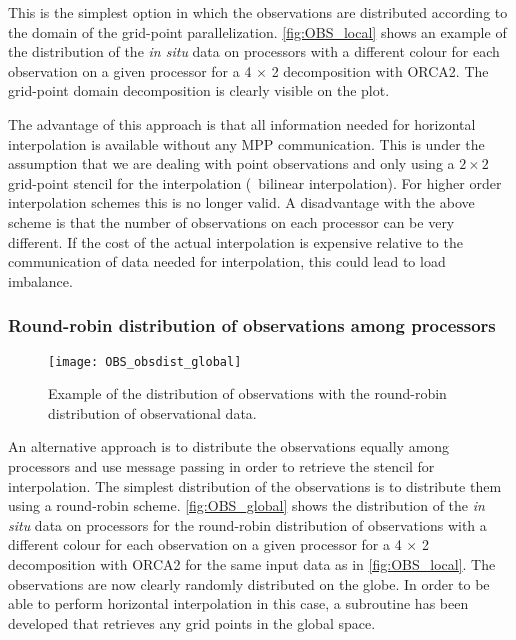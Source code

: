 \documentclass[../main/NEMO_manual]{subfiles}
\begin{document}
This is the simplest option in which the observations are distributed according to
the domain of the grid-point parallelization.
\autoref{fig:OBS_local} shows an example of the distribution of the {\em in situ} data on processors with
a different colour for each observation on a given processor for a 4 $\times$ 2 decomposition with ORCA2.
The grid-point domain decomposition is clearly visible on the plot.

The advantage of this approach is that all information needed for horizontal interpolation is available without
any MPP communication.
This is under the assumption that we are dealing with point observations and only using a $2 \times 2$ grid-point stencil for
the interpolation (\eg\ bilinear interpolation).
For higher order interpolation schemes this is no longer valid.
A disadvantage with the above scheme is that the number of observations on each processor can be very different.
If the cost of the actual interpolation is expensive relative to the communication of data needed for interpolation,
this could lead to load imbalance.

\subsubsection{Round-robin distribution of observations among processors}

\begin{figure}
  \centering
  \texttt{[image: OBS\_obsdist\_global]}
  \caption[Observations with the round-robin distribution]{
    Example of the distribution of observations with
    the round-robin distribution of observational data.}
  \label{fig:OBS_global}
\end{figure}

An alternative approach is to distribute the observations equally among processors and
use message passing in order to retrieve the stencil for interpolation.
The simplest distribution of the observations is to distribute them using a round-robin scheme.
\autoref{fig:OBS_global} shows the distribution of the {\em in situ} data on processors for
the round-robin distribution of observations with a different colour for each observation on a given processor for
a 4 $\times$ 2 decomposition with ORCA2 for the same input data as in \autoref{fig:OBS_local}.
The observations are now clearly randomly distributed on the globe.
In order to be able to perform horizontal interpolation in this case,
a subroutine has been developed that retrieves any grid points in the global space.
\end{document}
